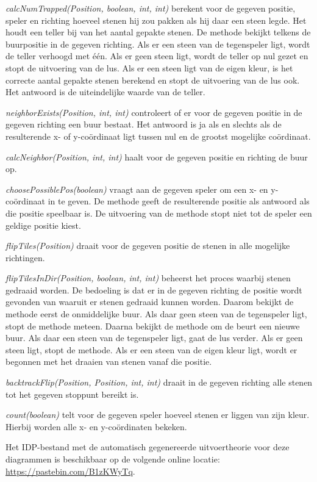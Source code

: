 \textit{calcNumTrapped(Position, boolean, int, int)} berekent voor de gegeven positie, speler en richting hoeveel stenen hij zou pakken als hij daar een steen legde. Het houdt een teller bij van het aantal gepakte stenen. De methode bekijkt telkens de buurpositie in de gegeven richting. Als er een steen van de tegenspeler ligt, wordt de teller verhoogd met \'e\'en. Als er geen steen ligt, wordt de teller op nul gezet en stopt de uitvoering van de lus. Als er een steen ligt van de eigen kleur, is het correcte aantal gepakte stenen berekend en stopt de uitvoering van de lus ook. Het antwoord is de uiteindelijke waarde van de teller.

\textit{neighborExists(Position, int, int)} controleert of er voor de gegeven positie in de gegeven richting een buur bestaat. Het antwoord is ja als en slechts als de resulterende x- of y-co\"ordinaat ligt tussen nul en de grootst mogelijke co\"ordinaat.

\textit{calcNeighbor(Position, int, int)} haalt voor de gegeven positie en richting de buur op.

\textit{choosePossiblePos(boolean)} vraagt aan de gegeven speler om een x- en y-co\"ordinaat in te geven. De methode geeft de resulterende positie als antwoord als die positie speelbaar is. De uitvoering van de methode stopt niet tot de speler een geldige positie kiest.

\textit{flipTiles(Position)} draait voor de gegeven positie de stenen in alle mogelijke richtingen.

\textit{flipTilesInDir(Position, boolean, int, int)} beheerst het proces waarbij stenen gedraaid worden. De bedoeling is dat er in de gegeven richting de positie wordt gevonden van waaruit er stenen gedraaid kunnen worden. Daarom bekijkt de methode eerst de onmiddelijke buur. Als daar geen steen van de tegenspeler ligt, stopt de methode meteen. Daarna bekijkt de methode om de beurt een nieuwe buur. Als daar een steen van de tegenspeler ligt, gaat de lus verder. Als er geen steen ligt, stopt de methode. Als er een steen van de eigen kleur ligt, wordt er begonnen met het draaien van stenen vanaf die positie.

\textit{backtrackFlip(Position, Position, int, int)} draait in de gegeven richting alle stenen tot het gegeven stoppunt bereikt is.

\textit{count(boolean)} telt voor de gegeven speler hoeveel stenen er liggen van zijn kleur. Hierbij worden alle x- en y-co\"ordinaten bekeken.

Het IDP-bestand met de automatisch gegenereerde uitvoertheorie voor deze diagrammen is beschikbaar op de volgende online locatie: \url{https://pastebin.com/B1zKWyTq}.

